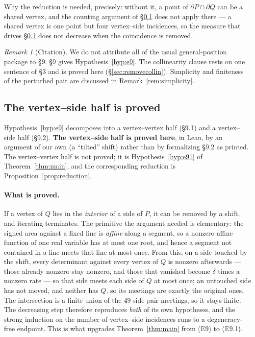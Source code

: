 \documentclass[11pt,a4paper]{article}
\theoremstyle{plain}
\theoremstyle{definition}
\theoremstyle{remark}
\newtheorem{remark}[theorem]{Remark}
\begin{document}
Why the reduction is needed, precisely: without it, a point of
$\partial P\cap\partial Q$ can be a shared vertex, and the counting argument of
\S\ref{sec:e9attempt} does not apply there --- a shared vertex is one point but
four vertex--side incidences, so the measure that drives \S\ref{sec:e9attempt}
does not decrease when the coincidence is removed.

\begin{remark}[Citation]
We do not attribute all of the usual general-position package to \S9. \S9
gives Hypothesis~\ref{hyp:e9}. The collinearity clause rests on one sentence
of \S3 and is proved here (\S\ref{sec:removecollin}). Simplicity and
finiteness of the perturbed pair are discussed in Remark~\ref{rem:simplicity}.
\end{remark}

\subsection{The vertex--side half is proved}\label{sec:e9attempt}

Hypothesis~\ref{hyp:e9} decomposes into a vertex--vertex half (\S9.1) and a
vertex--side half (\S9.2). \textbf{The vertex--side half is proved here}, in
Lean, by an argument of our own (a ``tilted'' shift) rather than by
formalizing \S9.2 as printed. The vertex--vertex half is not proved; it is
Hypothesis~\ref{hyp:e91} of Theorem~\ref{thm:main}, and the corresponding
reduction is Proposition~\ref{prop:reduction}.

\paragraph{What is proved.} If a vertex of $Q$ lies in the \emph{interior} of a
side of $P$, it can be removed by a shift, and iterating terminates. The
primitive the argument needed is elementary: the signed area against a fixed
line is \emph{affine} along a segment, so a
nonzero affine function of one real variable has at most one root, and hence a
segment not contained in a line meets that line at most once. From this, on a
side touched by the shift, every determinant against every vertex of $Q$ is
nonzero afterwards --- those already nonzero stay nonzero, and those that
vanished become $\delta$ times a nonzero rate --- so that side meets each side
of $Q$ at most once; an untouched side has not moved, and neither has $Q$, so
its meetings are exactly the original ones. The intersection is a finite union
of the $49$ side-pair meetings, so it stays finite. The decreasing step
therefore reproduces \emph{both} of its own hypotheses, and the strong
induction on the number of vertex--side incidences runs to a degeneracy-free
endpoint. This is what upgrades Theorem~\ref{thm:main} from (E9) to (E9.1).
\end{document}
